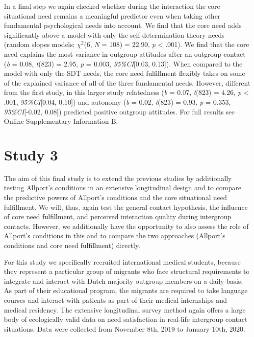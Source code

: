 In a final step we again checked whether during the interaction the core
situational need remains a meaningful predictor even when taking other
fundamental psychological needs into account. We find that the core need
adds significantly above a model with only the self determination theory
needs (random slopes models; \(\chi^2\)(6, \textit{N} = 108) = 22.90,
\textit{p} \textless{} .001). We find that the core need explains the
most variance in outgroup attitudes after an outgroup contact
(\textit{b} = 0.08, \textit{t}(823) = 2.95, \textit{p} = 0.003,
\textit{95\%CI}{[}0.03, 0.13{]}). When compared to the model with only
the SDT needs, the core need fulfillment flexibly takes on some of the
explained variance of all of the three fundamental needs. However,
different from the first study, in this larger study relatedness
(\textit{b} = 0.07, \textit{t}(823) = 4.26, \textit{p} \textless{} .001,
\textit{95\%CI}{[}0.04, 0.10{]}) and autonomy (\textit{b} = 0.02,
\textit{t}(823) = 0.93, \textit{p} = 0.353, \textit{95\%CI}{[}-0.02,
0.08{]}) predicted positive outgroup attitudes. For full results see
Online Supplementary Information B.

\section{Study 3}

The aim of this final study is to extend the previous studies by
additionally testing Allport's conditions in an extensive longitudinal
design and to compare the predictive powers of Allport's conditions and
the core situational need fulfillment. We will, thus, again test the
general contact hypothesis, the influence of core need fulfillment, and
perceived interaction quality during intergroup contacts. However, we
additionally have the opportunity to also assess the role of Allport's
conditions in this and to compare the two approaches (Allport's
conditions and core need fulfillment) directly.

For this study we specifically recruited international medical students,
because they represent a particular group of migrants who face
structural requirements to integrate and interact with Dutch majority
outgroup members on a daily basis. As part of their educational program,
the migrants are required to take language courses and interact with
patients as part of their medical internships and medical residency. The
extensive longitudinal survey method again offers a large body of
ecologically valid data on need satisfaction in real-life intergroup
contact situations. Data were collected from November 8th, 2019 to
January 10th, 2020.

